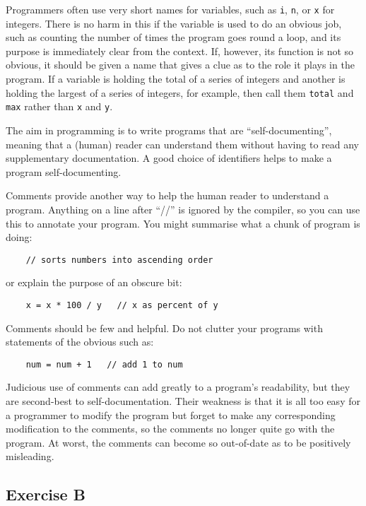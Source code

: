 Programmers often use very short names for variables, such as
\verb!i!, \verb!n!, or 
\verb!x! for integers.  There is no harm in this if the variable is used to
do an obvious job, such as counting the number of times the program goes round
a loop, and its purpose is immediately clear from the context.  If, however, its
function is not so obvious, it should be given a name that
gives a clue as to the role it plays in the program.  If a variable is
holding the total of a series of integers and another is holding the
largest of a series of integers, for example, then call them \verb!total!
and \verb!max! rather than \verb!x! and \verb!y!.

The aim in programming is to write programs that are ``self-documenting'',
meaning that a (human) reader can understand them without having to read
any supplementary documentation.  A good choice of identifiers helps to
make a program self-documenting.

Comments provide another way to help the human reader to understand a
program.  Anything on a line after ``//'' is ignored by the compiler,
so you can use this to annotate your program.  You might summarise
what a chunk of program is doing:

\begin{Verbatim}
    // sorts numbers into ascending order
\end{Verbatim}

or explain the purpose of an obscure bit:

\begin{Verbatim}
    x = x * 100 / y   // x as percent of y
\end{Verbatim}

Comments should be few and helpful.  Do not clutter your programs with
statements of the obvious such as:

\begin{Verbatim}
    num = num + 1   // add 1 to num
\end{Verbatim}

Judicious use of comments can add greatly to a program's readability, but they
are second-best to self-documentation.  Their weakness is that it is all too
easy for a programmer to modify the program but forget to make any
corresponding modification to the comments, so the comments no longer quite
go with the program.  At worst, the comments can become so out-of-date as
to be positively misleading.

\subsection*{Exercise B}

